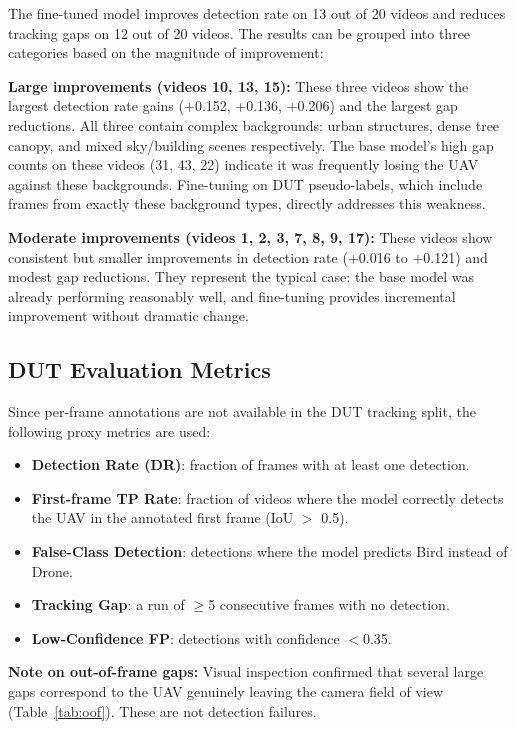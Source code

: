 \documentclass[12pt,a4paper]{report}
\begin{document}
The fine-tuned model improves detection rate on 13 out of 20 videos and
reduces tracking gaps on 12 out of 20 videos. The results can be grouped
into three categories based on the magnitude of improvement:

\textbf{Large improvements (videos 10, 13, 15):}
These three videos show the largest detection rate gains (+0.152, +0.136,
+0.206) and the largest gap reductions. All three contain complex backgrounds:
urban structures, dense tree canopy, and mixed sky/building scenes
respectively. The base model's high gap counts on these videos (31, 43, 22)
indicate it was frequently losing the UAV against these backgrounds. Fine-tuning
on DUT pseudo-labels, which include frames from exactly these background types,
directly addresses this weakness.

\textbf{Moderate improvements (videos 1, 2, 3, 7, 8, 9, 17):}
These videos show consistent but smaller improvements in detection rate
(+0.016 to +0.121) and modest gap reductions. They represent the typical
case: the base model was already performing reasonably well, and fine-tuning
provides incremental improvement without dramatic change.

\subsection{DUT Evaluation Metrics}

Since per-frame annotations are not available in the DUT tracking split, the
following proxy metrics are used:

\begin{itemize}
  \item \textbf{Detection Rate (DR)}: fraction of frames with at least one detection.
  \item \textbf{First-frame TP Rate}: fraction of videos where the model correctly
        detects the UAV in the annotated first frame (IoU $>$ 0.5).
  \item \textbf{False-Class Detection}: detections where the model predicts Bird
        instead of Drone.
  \item \textbf{Tracking Gap}: a run of $\geq$5 consecutive frames with no detection.
  \item \textbf{Low-Confidence FP}: detections with confidence $<$0.35.
\end{itemize}

\textbf{Note on out-of-frame gaps:} Visual inspection confirmed that several
large gaps correspond to the UAV genuinely leaving the camera field of view
(Table~\ref{tab:oof}). These are not detection failures.
\end{document}

